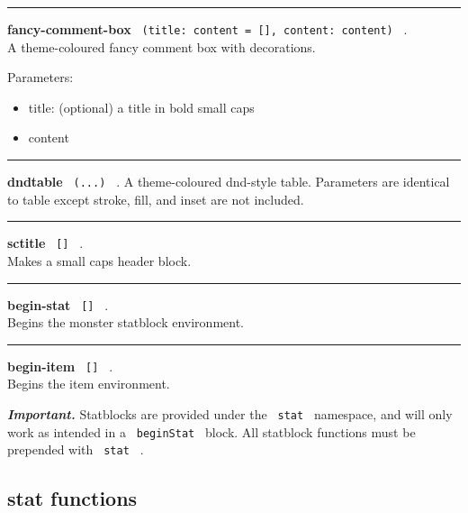 \begin{center}\rule{0.5\linewidth}{0.5pt}\end{center}

\textbf{fancy-comment-box}
\texttt{\ (title:\ content\ =\ {[}{]},\ content:\ content)\ } .\\
A theme-coloured fancy comment box with decorations.

Parameters:

\begin{itemize}
\tightlist
\item
  title: (optional) a title in bold small caps
\item
  content
\end{itemize}

\begin{center}\rule{0.5\linewidth}{0.5pt}\end{center}

\textbf{dndtable} \texttt{\ (...)\ } . A theme-coloured dnd-style table.
Parameters are identical to table except stroke, fill, and inset are not
included.

\begin{center}\rule{0.5\linewidth}{0.5pt}\end{center}

\textbf{sctitle} \texttt{\ {[}{]}\ } .\\
Makes a small caps header block.

\begin{center}\rule{0.5\linewidth}{0.5pt}\end{center}

\textbf{begin-stat} \texttt{\ {[}{]}\ } .\\
Begins the monster statblock environment.

\begin{center}\rule{0.5\linewidth}{0.5pt}\end{center}

\textbf{begin-item} \texttt{\ {[}{]}\ } .\\
Begins the item environment.

\emph{\textbf{Important.}} Statblocks are provided under the
\texttt{\ stat\ } namespace, and will only work as intended in a
\texttt{\ beginStat\ } block. All statblock functions must be prepended
with \texttt{\ stat\ } .

\subsection{stat functions}\label{stat-functions}

